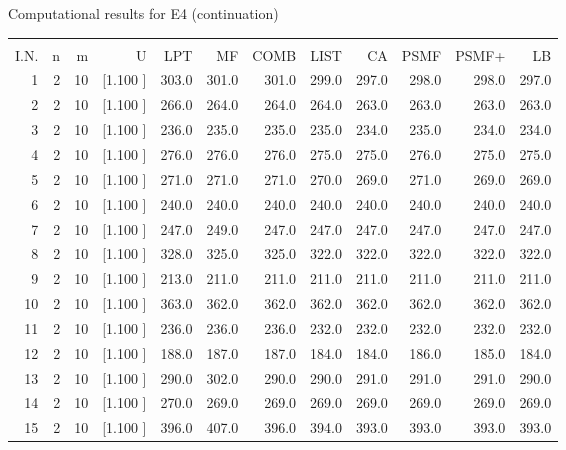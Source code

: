 \documentclass[12pt,a4paper]{article}
\begin{document}
\newpage
\begin{center}
 Computational results for E4 (continuation) {\tiny
\begin{tabular}{r r r r r r r r r r r r}\hline
    &   &   &          &        &        &        &        &        &        &        &       \\[-0.1in]
  I.N.  &  n  &  m  &  U  &  LPT  &  MF  &  COMB  &  LIST  &  CA  & PSMF &PSMF+ & LB \\[0.03in]
\hline
   1&  2& 10&[1.100     ]&   303.0&   301.0&   301.0&   299.0&   297.0&   298.0&   298.0&   297.0\\[-0.02in]
   2&  2& 10&[1.100     ]&   266.0&   264.0&   264.0&   264.0&   263.0&   263.0&   263.0&   263.0\\[-0.02in]
   3&  2& 10&[1.100     ]&   236.0&   235.0&   235.0&   235.0&   234.0&   235.0&   234.0&   234.0\\[-0.02in]
   4&  2& 10&[1.100     ]&   276.0&   276.0&   276.0&   275.0&   275.0&   276.0&   275.0&   275.0\\[-0.02in]
   5&  2& 10&[1.100     ]&   271.0&   271.0&   271.0&   270.0&   269.0&   271.0&   269.0&   269.0\\[-0.02in]
   6&  2& 10&[1.100     ]&   240.0&   240.0&   240.0&   240.0&   240.0&   240.0&   240.0&   240.0\\[-0.02in]
   7&  2& 10&[1.100     ]&   247.0&   249.0&   247.0&   247.0&   247.0&   247.0&   247.0&   247.0\\[-0.02in]
   8&  2& 10&[1.100     ]&   328.0&   325.0&   325.0&   322.0&   322.0&   322.0&   322.0&   322.0\\[-0.02in]
   9&  2& 10&[1.100     ]&   213.0&   211.0&   211.0&   211.0&   211.0&   211.0&   211.0&   211.0\\[-0.02in]
  10&  2& 10&[1.100     ]&   363.0&   362.0&   362.0&   362.0&   362.0&   362.0&   362.0&   362.0\\[-0.02in]
  11&  2& 10&[1.100     ]&   236.0&   236.0&   236.0&   232.0&   232.0&   232.0&   232.0&   232.0\\[-0.02in]
  12&  2& 10&[1.100     ]&   188.0&   187.0&   187.0&   184.0&   184.0&   186.0&   185.0&   184.0\\[-0.02in]
  13&  2& 10&[1.100     ]&   290.0&   302.0&   290.0&   290.0&   291.0&   291.0&   291.0&   290.0\\[-0.02in]
  14&  2& 10&[1.100     ]&   270.0&   269.0&   269.0&   269.0&   269.0&   269.0&   269.0&   269.0\\[-0.02in]
  15&  2& 10&[1.100     ]&   396.0&   407.0&   396.0&   394.0&   393.0&   393.0&   393.0&   393.0\\[-0.02in]

\end{tabular}}
\end{center}
\end{document}
